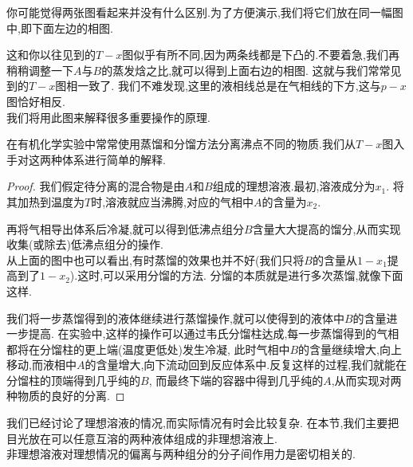 \documentclass{ctexart}
\begin{document}
\begin{derivation}
    \begin{center}
        
    \end{center}
    你可能觉得两张图看起来并没有什么区别.为了方便演示,我们将它们放在同一幅图中,即下面左边的相图.
    \begin{center}
        
    \end{center}
    这和你以往见到的$T-x$图似乎有所不同,因为两条线都是下凸的.不要着急,我们再稍稍调整一下$A$与$B$的蒸发焓之比,就可以得到上面右边的相图.%
    这就与我们常常见到的$T-x$图相一致了\footnotemark.%
    我们不难发现,这里的液相线总是在气相线的下方,这与$p-x$图恰好相反.\\
    我们将用此图来解释很多重要操作的原理.
\end{derivation}
\indent 在有机化学实验中常常使用蒸馏和分馏方法分离沸点不同的物质.我们从$T-x$图入手对这两种体系进行简单的解释.
\begin{proof}
    我们假定待分离的混合物是由$A$和$B$组成的理想溶液.最初,溶液成分为$x_1$.%
    将其加热到温度为$T$时,溶液就应当沸腾,对应的气相中$A$的含量为$x_2$.
    \begin{center}
        
    \end{center}
    再将气相导出体系后冷凝,就可以得到低沸点组分$B$含量大大提高的馏分,从而实现收集(或除去)低沸点组分的操作.\\
    从上面的图中也可以看出,有时蒸馏的效果也并不好(我们只将$B$的含量从$1-x_1$提高到了$1-x_2$).这时,可以采用分馏的方法.%
    分馏的本质就是进行多次蒸馏,就像下面这样.
    \begin{center}
        
    \end{center}
    我们将一步蒸馏得到的液体继续进行蒸馏操作,就可以使得到的液体中$B$的含量进一步提高.%
    在实验中,这样的操作可以通过韦氏分馏柱达成,每一步蒸馏得到的气相都将在分馏柱的更上端(温度更低处)发生冷凝,%
    此时气相中$B$的含量继续增大,向上移动,而液相中$A$的含量增大,向下流动回到反应体系中.反复这样的过程,我们就能在分馏柱的顶端得到几乎纯的$B$,%
    而最终下端的容器中得到几乎纯的$A$,从而实现对两种物质的良好的分离.
\end{proof}
\indent 我们已经讨论了理想溶液的情况,而实际情况有时会比较复杂.%
在本节,我们主要把目光放在可以任意互溶的两种液体组成的非理想溶液上.\\
\indent 非理想溶液对理想情况的偏离与两种组分的分子间作用力是密切相关的.%
\end{document}

